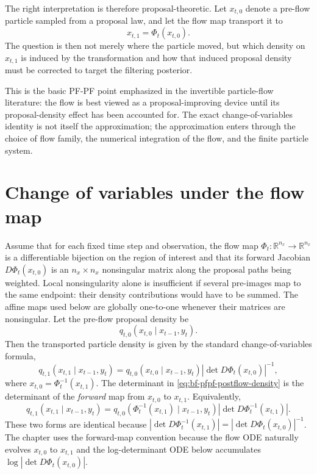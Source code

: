 The right interpretation is therefore proposal-theoretic.  Let
$x_{t,0}$ denote a pre-flow particle sampled from a proposal law, and let the
flow map transport it to
\begin{equation}
\label{eq:bf-pfpf-flow-map}
  x_{t,1} = \Phi_t(x_{t,0}).
\end{equation}
The question is then not merely where the particle moved, but which density on
$x_{t,1}$ is induced by the transformation and how that induced proposal density
must be corrected to target the filtering posterior.

This is the basic PF-PF point emphasized in the invertible particle-flow
literature: the flow is best viewed as a proposal-improving device until its
proposal-density effect has been accounted for.  The exact change-of-variables
identity is not itself the approximation; the approximation enters through the
choice of flow family, the numerical integration of the flow, and the finite
particle system.

\section{Change of variables under the flow map}
\label{sec:bf-pfpf-change-of-variables}

Assume that for each fixed time step and observation, the flow map
$\Phi_t: \mathbb{R}^{n_x} \to \mathbb{R}^{n_x}$ is a differentiable bijection on
the region of interest and that its forward Jacobian
$D\Phi_t(x_{t,0})$ is an $n_x\times n_x$ nonsingular matrix along the proposal
paths being weighted.  Local nonsingularity alone is insufficient if several pre-images map to the
same endpoint: their density contributions would have to be summed. The affine
maps used below are globally one-to-one whenever their matrices are
nonsingular. Let
the pre-flow proposal density be
\begin{equation}
\label{eq:bf-pfpf-preflo-density}
  q_{t,0}(x_{t,0} \mid x_{t-1}, y_t).
\end{equation}
Then the transported particle density is given by the standard
change-of-variables formula,
\begin{equation}
\label{eq:bf-pfpf-postflow-density}
  q_{t,1}(x_{t,1} \mid x_{t-1}, y_t)
  = q_{t,0}(x_{t,0} \mid x_{t-1}, y_t)
    \left|\det D\Phi_t(x_{t,0})\right|^{-1},
\end{equation}
where $x_{t,0} = \Phi_t^{-1}(x_{t,1})$.
The determinant in \eqref{eq:bf-pfpf-postflow-density} is the determinant of
the \emph{forward} map from $x_{t,0}$ to $x_{t,1}$.  Equivalently,
\[
  q_{t,1}(x_{t,1}\mid x_{t-1},y_t)
  =
  q_{t,0}(\Phi_t^{-1}(x_{t,1})\mid x_{t-1},y_t)
  \left|\det D\Phi_t^{-1}(x_{t,1})\right|.
\]
These two forms are identical because
$|\det D\Phi_t^{-1}(x_{t,1})|
=|\det D\Phi_t(x_{t,0})|^{-1}$.  The chapter uses the forward-map convention
because the flow ODE naturally evolves $x_{t,0}$ to $x_{t,1}$ and the
log-determinant ODE below accumulates $\log|\det D\Phi_t(x_{t,0})|$.

